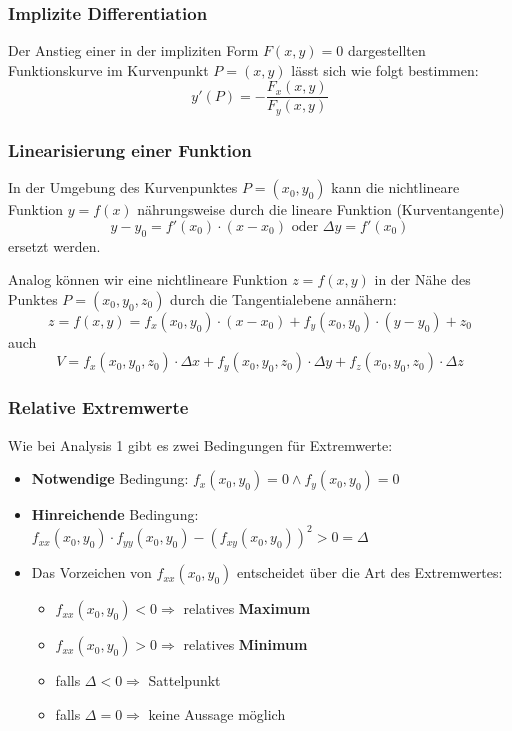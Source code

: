 \subsubsection{Implizite Differentiation}
\begin{definition}
Der Anstieg einer in der impliziten Form $F(x, y) = 0$ dargestellten Funktionskurve im Kurvenpunkt $P=(x,y)$ lässt sich wie folgt bestimmen:
$$y'(P) = - \frac{F_x(x,y)}{F_y(x,y)}$$
\end{definition}

\subsubsection{Linearisierung einer Funktion}
\begin{definition}
In der Umgebung des Kurvenpunktes $P=(x_0,y_0)$ kann die nichtlineare Funktion $y=f(x)$ nährungsweise durch die lineare Funktion (Kurventangente)
$$y -y_0 = f'(x_0) \cdot (x - x_0) \text{ oder } \Delta y = f'(x_0)$$
ersetzt werden. 

Analog können wir eine nichtlineare Funktion $z=f(x,y)$ in der Nähe des Punktes $P=(x_0, y_0, z_0)$ durch die Tangentialebene annähern:
$$z=f(x,y) = f_x(x_0, y_0) \cdot (x-x_0) + f_y(x_0, y_0) \cdot (y-y_0) + z_0$$
auch 
$$ V= f_x(x_0, y_0, z_0) \cdot \Delta x + f_y(x_0, y_0, z_0) \cdot \Delta y + f_z(x_0, y_0, z_0) \cdot \Delta z$$
\end{definition}

\subsubsection{Relative Extremwerte}
\begin{definition}
Wie bei Analysis 1 gibt es zwei Bedingungen für Extremwerte:
\begin{itemize}
	\item \textbf{Notwendige} Bedingung: $f_x(x_0, y_0) = 0 \wedge f_y(x_0, y_0) = 0$
	\item \textbf{Hinreichende} Bedingung: $f_{xx}(x_0, y_0) \cdot f_{yy}(x_0, y_0)  - (f_{xy}(x_0, y_0))^2 > 0 = \Delta$
	\item  Das Vorzeichen von \textbf{$f_{xx}(x_0, y_0)$} entscheidet über die Art des Extremwertes:
	\begin{itemize}
		\item $f_{xx}(x_0, y_0) < 0 \Rightarrow $ relatives \textbf{Maximum}
		\item $f_{xx}(x_0, y_0) > 0 \Rightarrow $ relatives \textbf{Minimum}
		\item falls $\Delta < 0 \Rightarrow$ Sattelpunkt
		\item falls $\Delta = 0 \Rightarrow$ keine Aussage möglich
		\end{itemize}
\end{itemize}
\end{definition}


